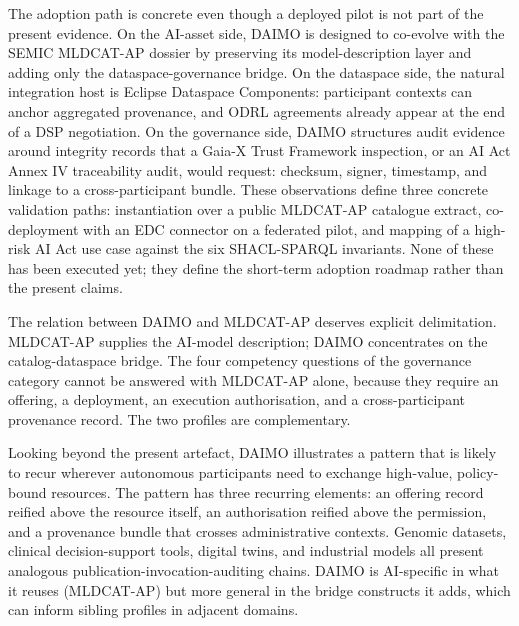 \documentclass[11pt,a4paper]{article}
\begin{document}
The adoption path is concrete even though a deployed pilot is not part of the present evidence. On the AI-asset side, DAIMO is designed to co-evolve with the SEMIC MLDCAT-AP dossier by preserving its model-description layer and adding only the dataspace-governance bridge. On the dataspace side, the natural integration host is Eclipse Dataspace Components: participant contexts can anchor aggregated provenance, and ODRL agreements already appear at the end of a DSP negotiation. On the governance side, DAIMO structures audit evidence around integrity records that a Gaia-X Trust Framework inspection, or an AI Act Annex IV traceability audit, would request: checksum, signer, timestamp, and linkage to a cross-participant bundle. These observations define three concrete validation paths: instantiation over a public MLDCAT-AP catalogue extract, co-deployment with an EDC connector on a federated pilot, and mapping of a high-risk AI Act use case against the six SHACL-SPARQL invariants. None of these has been executed yet; they define the short-term adoption roadmap rather than the present claims.

The relation between DAIMO and MLDCAT-AP deserves explicit delimitation. MLDCAT-AP supplies the AI-model description; DAIMO concentrates on the catalog-dataspace bridge. The four competency questions of the governance category cannot be answered with MLDCAT-AP alone, because they require an offering, a deployment, an execution authorisation, and a cross-participant provenance record. The two profiles are complementary.

Looking beyond the present artefact, DAIMO illustrates a pattern that is likely to recur wherever autonomous participants need to exchange high-value, policy-bound resources. The pattern has three recurring elements: an offering record reified above the resource itself, an authorisation reified above the permission, and a provenance bundle that crosses administrative contexts. Genomic datasets, clinical decision-support tools, digital twins, and industrial models all present analogous publication-invocation-auditing chains. DAIMO is AI-specific in what it reuses (MLDCAT-AP) but more general in the bridge constructs it adds, which can inform sibling profiles in adjacent domains.
\end{document}
